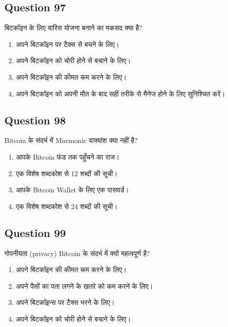 \documentclass[12pt,a4paper]{article}
\begin{document}
\bigskip


\subsection*{Question 97}
बिटकॉइन के लिए वारिस योजना बनाने का मकसद क्या है?

\begin{enumerate}[label=\Alph*., leftmargin=*]
\item अपने बिटकॉइन पर टैक्स से बचने के लिए।
\item अपने बिटकॉइन को चोरी होने से बचाने के लिए।
\item अपने बिटकॉइन की कीमत कम करने के लिए।
\item अपने बिटकॉइन को अपनी मौत के बाद सही तरीके से मैनेज होने के लिए सुनिश्चित करें।
\end{enumerate}

\bigskip


\subsection*{Question 98}
Bitcoin के संदर्भ में Mnemonic वाक्यांश क्या नहीं है?

\begin{enumerate}[label=\Alph*., leftmargin=*]
\item आपके Bitcoin फंड तक पहुँचने का राज।
\item एक विशेष शब्दकोश से 12 शब्दों की सूची।
\item आपके Bitcoin Wallet के लिए एक पासवर्ड।
\item एक विशेष शब्दकोश से 24 शब्दों की सूची।
\end{enumerate}

\bigskip


\subsection*{Question 99}
गोपनीयता (privacy) Bitcoin के संदर्भ में क्यों महत्वपूर्ण है?

\begin{enumerate}[label=\Alph*., leftmargin=*]
\item अपने बिटकॉइन की कीमत कम करने के लिए।
\item अपने पैसों का पता लगने के खतरे को कम करने के लिए।
\item अपने बिटकॉइन्स पर टैक्स भरने के लिए।
\item अपने बिटकॉइन को चोरी होने से बचाने के लिए।
\end{enumerate}
\end{document}
